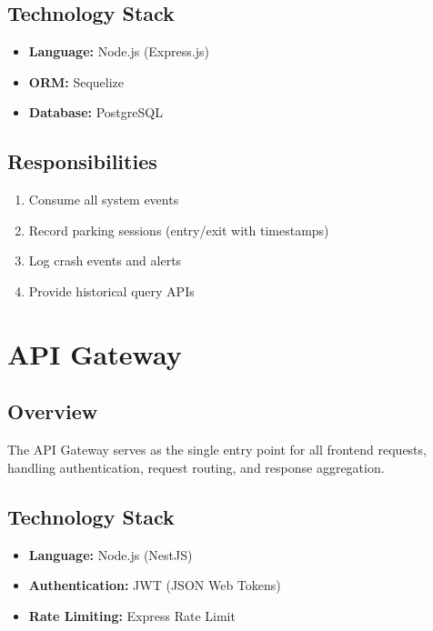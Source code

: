 \documentclass[12pt,a4paper]{report}
\begin{document}
\subsection{Technology Stack}
\begin{itemize}
    \item \textbf{Language:} Node.js (Express.js)
    \item \textbf{ORM:} Sequelize
    \item \textbf{Database:} PostgreSQL
\end{itemize}

\subsection{Responsibilities}
\begin{enumerate}
    \item Consume all system events
    \item Record parking sessions (entry/exit with timestamps)
    \item Log crash events and alerts
    \item Provide historical query APIs
\end{enumerate}


\section{API Gateway}

\subsection{Overview}
The API Gateway serves as the single entry point for all frontend requests, handling authentication, request routing, and response aggregation.

\subsection{Technology Stack}
\begin{itemize}
    \item \textbf{Language:} Node.js (NestJS)
    \item \textbf{Authentication:} JWT (JSON Web Tokens)
    \item \textbf{Rate Limiting:} Express Rate Limit
\end{itemize}
\end{document}
